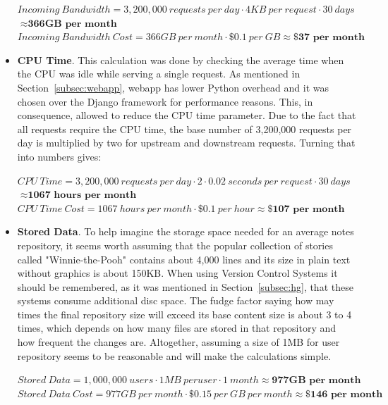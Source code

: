 \begin{itemize}
{$Incoming\ Bandwidth =  3,200,000\ requests\ per\ day \cdot 4KB\ per\ request \cdot 30\ days$\\ \hspace*{33mm} $\approx \textbf{366GB\ per\ month}$ \\
$Incoming\ Bandwidth\ Cost = 366GB\ per\ month \cdot \$0.1\ per\ GB \approx \textbf{\$37 per\ month}$ }
 
\item{\textbf{CPU Time}. This calculation was done by checking the average time when the CPU was idle while serving a single request. As mentioned in Section~\ref{subsec:webapp}, webapp has lower Python overhead and it was chosen over the Django framework for performance reasons. This, in consequence, allowed to reduce the CPU time parameter. Due to the fact that all requests require the CPU time, the base number of 3,200,000 requests per day is multiplied by two for upstream and downstream requests. Turning that into numbers gives:
 
$CPU\ Time =  3,200,000\ requests\ per\ day \cdot 2 \cdot 0.02\ seconds\ per\ request \cdot 30\ days$\\ \hspace*{17mm} $\approx \textbf{1067\ hours\ per\ month}$ \\
$CPU\ Time\ Cost = 1067\ hours\ per\ month \cdot \$0.1\ per\ hour \approx \textbf{\$107 per\ month}$}
 
\item{\textbf{Stored Data}. To help imagine the storage space needed for an average notes repository, it seems worth assuming that the popular collection of stories called "Winnie-the-Pooh" contains about 4,000 lines and its size in plain text without graphics is about 150KB. When using Version Control Systems it should be remembered, as it was mentioned in Section~\ref{subsec:hg}, that these systems consume additional disc space. The fudge factor saying how may times the final repository size will exceed its base content size is about 3 to 4 times, which depends on how many files are stored in that repository and how frequent the changes are. Altogether, assuming a size of 1MB for user repository seems to be reasonable and will make the calculations simple.
 
$Stored\ Data =  1,000,000\ users\cdot 1MB\ per user \cdot 1\ month \approx \textbf{977GB\ per\ month}$ \\
$Stored\ Data\ Cost = 977GB\ per\ month \cdot \$0.15\ per\ GB\ per\ month \approx \textbf{\$146 per\ month}$}
 

\end{itemize}
